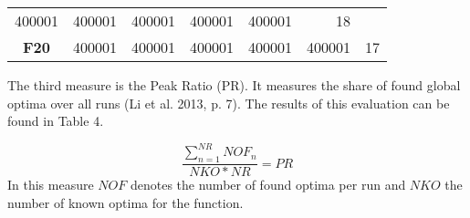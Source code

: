 \documentclass[12pt,a4paper]{article}
\begin{document}
\begin{longtable}[c]{@{}crrrrrr@{}}
\begin{minipage}[t]{0.08\columnwidth}
400001
\strut\end{minipage} &
\begin{minipage}[t]{0.08\columnwidth}\raggedleft\strut
400001
\strut\end{minipage} &
\begin{minipage}[t]{0.09\columnwidth}\raggedleft\strut
400001
\strut\end{minipage} &
\begin{minipage}[t]{0.10\columnwidth}\raggedleft\strut
400001
\strut\end{minipage} &
\begin{minipage}[t]{0.11\columnwidth}\raggedleft\strut
400001
\strut\end{minipage} &
\begin{minipage}[t]{0.07\columnwidth}\raggedleft\strut
18
\strut\end{minipage}\tabularnewline
\begin{minipage}[t]{0.11\columnwidth}\centering\strut
\textbf{F20}
\strut\end{minipage} &
\begin{minipage}[t]{0.08\columnwidth}\raggedleft\strut
400001
\strut\end{minipage} &
\begin{minipage}[t]{0.08\columnwidth}\raggedleft\strut
400001
\strut\end{minipage} &
\begin{minipage}[t]{0.09\columnwidth}\raggedleft\strut
400001
\strut\end{minipage} &
\begin{minipage}[t]{0.10\columnwidth}\raggedleft\strut
400001
\strut\end{minipage} &
\begin{minipage}[t]{0.11\columnwidth}\raggedleft\strut
400001
\strut\end{minipage} &
\begin{minipage}[t]{0.07\columnwidth}\raggedleft\strut
17
\strut\end{minipage}\tabularnewline
\bottomrule
\end{longtable}

The third measure is the Peak Ratio (PR). It measures the share of found
global optima over all runs (Li et al. 2013, p. 7). The results of this
evaluation can be found in Table 4.

\[\frac{\sum\nolimits_{n=1}^{NR} NOF_{n}}{NKO * NR} = PR\] \newline
In this measure \(NOF\) denotes the number of found optima per run and
\(NKO\) the number of known optima for the function. \newline
\end{document}
